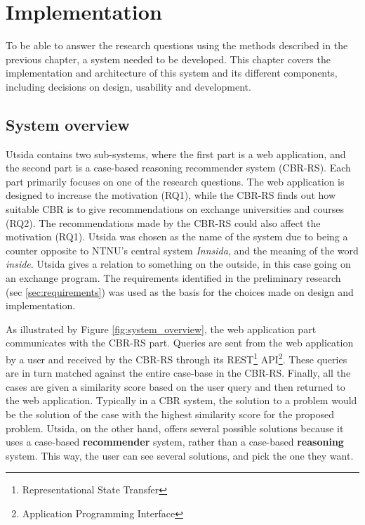
\chapter{Implementation}\label{ch5:implementation}

To be able to answer the research questions using the methods described in the previous chapter, a system needed to be developed. This chapter covers the implementation and architecture of this system and its different components, including decisions on design, usability and development.

\section{System overview}

Utsida contains two sub-systems, where the first part is a web application, and the second part is a case-based reasoning recommender system (CBR-RS). Each part primarily focuses on one of the research questions. The web application is designed to increase the motivation (RQ1), while the CBR-RS finds out how suitable CBR is to give recommendations on exchange universities and courses (RQ2). The recommendations made by the CBR-RS could also affect the motivation (RQ1). Utsida was chosen as the name of the system due to being a counter opposite to NTNU's central system \emph{Innsida}, and the meaning of the word \emph{inside}. Utsida gives a relation to something on the outside, in this case going on an exchange program. The requirements identified in the preliminary research (sec \ref{sec:requirements})  was used as the basis for the choices made on design and implementation.

As illustrated by Figure \ref{fig:system_overview}, the web application part communicates with the CBR-RS part. Queries are sent from the web application by a user and received by the CBR-RS through its REST\footnote{Representational State Transfer} API\footnote{Application Programming Interface}. These queries are in turn matched against the entire case-base in the CBR-RS. Finally, all the cases are given a similarity score based on the user query and then returned to the web application. Typically in a CBR system, the solution to a problem would be the solution of the case with the highest similarity score for the proposed problem. Utsida, on the other hand, offers several possible solutions because it uses a case-based \textbf{recommender} system, rather than a case-based \textbf{reasoning} system. This way, the user can see several solutions, and pick the one they want.  

